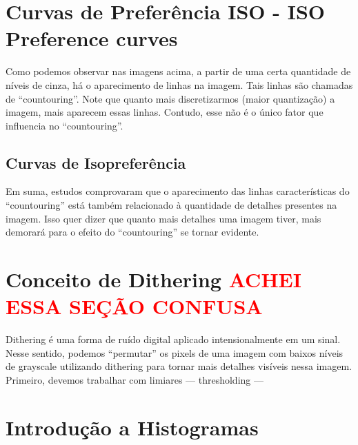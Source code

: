 \documentclass[a4paper, 12pt]{article}
\begin{document}
\section{Curvas de Preferência ISO - ISO Preference curves}
Como podemos observar nas imagens acima, a partir de uma certa quantidade de níveis de cinza, há o aparecimento de linhas na imagem. 
Tais linhas são chamadas de ``countouring''. Note que quanto mais discretizarmos (maior quantização) a imagem, mais aparecem essas linhas.
Contudo, esse não é o único fator que influencia no ``countouring''.
\subsection{Curvas de Isopreferência}
Em suma, estudos comprovaram que o aparecimento das linhas características do ``countouring'' está também relacionado à quantidade de detalhes presentes 
na imagem. Isso quer dizer que quanto mais detalhes uma imagem tiver, mais demorará para o efeito do ``countouring'' se tornar evidente.

\section{Conceito de Dithering \textcolor{red}{ACHEI ESSA SEÇÃO CONFUSA}}
Dithering é uma forma de ruído digital aplicado intensionalmente em um sinal. Nesse sentido, podemos ``permutar'' os pixels de uma imagem com baixos níveis de grayscale 
utilizando dithering para tornar mais detalhes visíveis nessa imagem.
\\

Primeiro, devemos trabalhar com limiares --- thresholding --- 

\section{Introdução a Histogramas}
\end{document}
